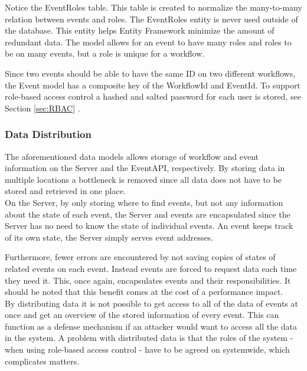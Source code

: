 Notice the EventRoles table. This table is created to normalize the many-to-many relation between events and roles. The EventRoles entity is never used outside of the database. This entity helps Entity Framework minimize the amount of redundant data. The model allows for an event to have many roles and roles to be on many events, but a role is unique for a workflow. 

Since two events should be able to have the same ID on two different workflows, the Event model has a composite key of the WorkflowId and EventId. 
To support role-based access control a hashed and salted password for each user is stored, see Section \ref{sec:RBAC} .

\subsubsection{Data Distribution}
The aforementioned data models allows storage of workflow and event information on the Server and the EventAPI, respectively. By storing data in multiple locations a bottleneck is removed since all data does not have to be stored and retrieved in one place. \\

On the Server, by only storing where to find events, but not any information about the state of each event, the Server and events are encapsulated since the Server has no need to know the state of individual events. An event keeps track of its own state, the Server simply serves event addresses. 

Furthermore, fewer errors are encountered by not saving copies of states of related events on each event. Instead events are forced to request data each time they need it. This, once again, encapsulates events and their responsibilities. It should be noted that this benefit comes at the cost of a performance impact.\\

By distributing data it is not possible to get access to all of the data of events at once and get an overview of the stored information of every event. This can function as a defense mechanism if an attacker would want to access all the data in the system. 
A problem with distributed data is that the roles of the system - when using role-based access control - have to be agreed on systemwide, which complicates matters. 